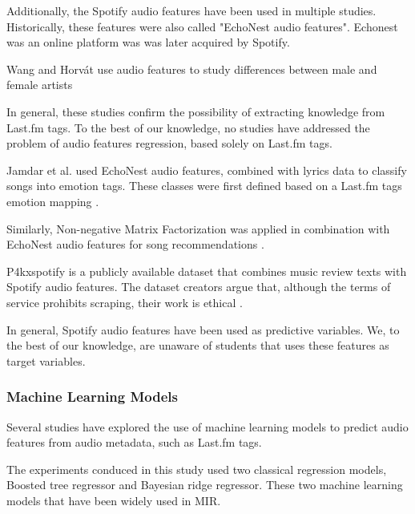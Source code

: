 \documentclass[sn-mathphys]{sn-jnl}%
\theoremstyle{thmstyleone}%
\theoremstyle{thmstyletwo}%
\theoremstyle{thmstylethree}%
\begin{document}


Additionally, the Spotify audio features have been used in multiple studies.
Historically, these features were also called "EchoNest audio features".
Echonest was an online platform was was later acquired by Spotify.

Wang and Horv{\'a}t use audio features to study differences between male and female artists \cite{wang2019gender}


In general, these studies confirm the possibility of extracting knowledge from Last.fm tags.
To the best of our knowledge, no studies have addressed the problem of audio features regression, based solely on Last.fm tags.

Jamdar et al. used EchoNest audio features, combined with lyrics data to classify songs into emotion tags.
These classes were first defined based on a Last.fm tags emotion mapping \cite{jamdar2015emotion}.

Similarly, Non-negative Matrix Factorization was applied in combination with EchoNest audio features
for song recommendations \cite{benzi2016song}.

P4kxspotify is a publicly available dataset that combines music review texts with Spotify audio features.
The dataset creators argue that, although the terms of service prohibits scraping, their work is ethical \cite{pinter2020p4kxspotify}.

In general, Spotify audio features have been used as predictive variables.
We, to the best of our knowledge, are unaware of students that uses these features as target variables.

\subsubsection{Machine Learning Models}

Several studies have explored the use of machine learning
models to predict audio features from audio metadata, such as Last.fm tags.

The experiments conduced in this study used two classical regression models,
Boosted tree regressor and Bayesian ridge regressor.
These two machine learning models that have been widely used in MIR. %
\end{document}
